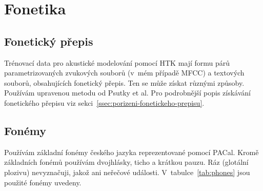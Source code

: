 \section{Fonetika}
\label{sec:ac:fonetika}

\subsection{Fonetický přepis}

Trénovací data pro akustické modelování pomocí HTK mají formu párů
parametrizovaných zvukových souborů (v~mém případě MFCC) a textových souborů,
obsahujících fonetický přepis. Ten se může získat různými způsoby. Používám
upravenou metodu od Psutky et al.\cite{psutka2004development} Pro podrobnější
popis získávání fonetického přepisu viz
sekci~\ref{ssec:porizeni-fonetickeho-prepisu}.

\subsection{Fonémy}

Používám základní fonémy českého jazyka\cite{palkova1992fonetika}
reprezentované pomocí PACal\cite{nouza1997phonetic}. Kromě základních fonémů
používám dvojhlásky, ticho a krátkou pauzu. Ráz (glotální plozivu) nevyznačuji,
jakož ani neřečové události.
V~tabulce~\ref{tab:phones} jsou použité fonémy uvedeny.

